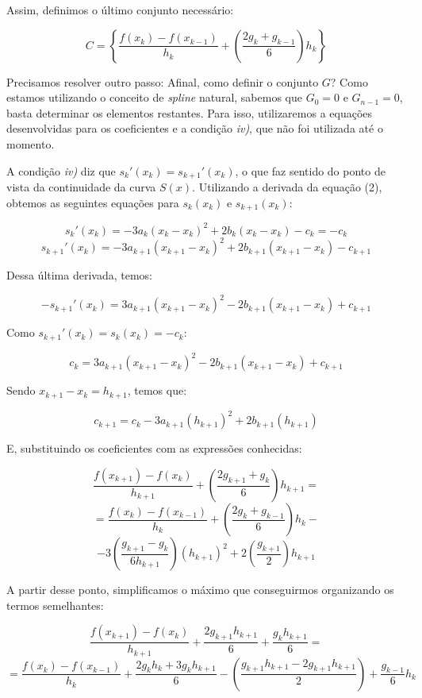 \documentclass[11pt]{article}
\begin{document}
Assim, definimos o último conjunto necessário: 

$$C = \left\lbrace \frac{f(x_k) - f(x_{k-1})}{h_k} + \left( \frac{2g_k + g_{k-1}}{6}\right)h_k \right\rbrace$$

Precisamos resolver outro passo: Afinal, como definir o conjunto
$G$? Como estamos utilizando o conceito de \textit{spline} natural,
sabemos que $G_0 = 0$ e $G_{n-1} = 0$, basta determinar os elementos restantes.
Para isso, utilizaremos a equações desenvolvidas para os coeficientes e a
condição \textit{iv)}, que não foi utilizada até o momento.

A condição \textit{iv)} diz que $s_k'(x_k) = s_{k+1}'(x_k)$, o que faz
sentido do ponto de vista da continuidade da curva $S(x)$. Utilizando a
derivada da equação (2), obtemos as seguintes equações para $s_k(x_k)$ e
$s_{k+1}(x_k)$:

$$s_k'(x_k) = -3a_k(x_k - x_k)^2 + 2b_k(x_k - x_k) - c_k = -c_k$$
$$s_{k+1}'(x_k) = -3a_{k+1}(x_{k+1} - x_k)^2 + 2b_{k+1}(x_{k+1} - x_k) - c_{k+1}$$

Dessa última derivada, temos:

$$-s_{k+1}'(x_k) = 3a_{k+1}(x_{k+1} - x_k)^2 - 2b_{k+1}(x_{k+1} - x_k) + c_{k+1}$$

Como $s_{k+1}'(x_k) = s_k(x_k) = -c_k$:

\begin{equation}
c_k = 3a_{k+1}(x_{k+1} - x_k)^2 - 2b_{k+1}(x_{k+1} - x_k) + c_{k+1}
\end{equation}

Sendo $x_{k+1} - x_k = h_{k+1}$, temos que:

$$c_{k+1} = c_k - 3a_{k+1}(h_{k+1})^2 + 2b_{k+1}(h_{k+1})$$

E, substituindo os coeficientes com as expressões conhecidas:

$$\frac{f(x_{k+1}) - f(x_k)}{h_{k+1}} + \left( \frac{2g_{k+1} + g_k}{6} \right)h_{k+1} = $$
$$ = \frac{f(x_k) - f(x_{k-1})}{h_k} + \left( \frac{2g_k + g_{k-1}}{6} \right)h_k - $$
$$ - 3\left( \frac{g_{k+1} - g_k}{6h_{k+1}} \right)(h_{k+1})^2 + 2\left( \frac{g_{k+1}}{2} \right)h_{k+1} $$

A partir desse ponto, simplificamos o máximo que conseguirmos organizando
os termos semelhantes:

$$\frac{f(x_{k+1}) - f(x_k)}{h_{k+1}} + \frac{2g_{k+1}h_{k+1}}{6} + \frac{g_kh_{k+1}}{6} = $$
$$ = \frac{f(x_k) - f(x_{k-1})}{h_k} + \frac{2g_kh_k + 3g_kh_{k+1}}{6} - \left(\frac{g_{k+1}h_{k+1} - 2g_{k+1}h_{k+1}}{2} \right) + \frac{g_{k-1}}{6}h_k$$
\end{document}
